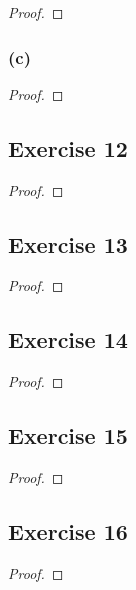 \documentclass[14pt]{extarticle}
\begin{document}
\begin{proof}

\end{proof}

\subsubsection{(c)}

\begin{proof}

\end{proof}

\subsection{Exercise 12}

\begin{proof}

\end{proof}

\subsection{Exercise 13}

\begin{proof}

\end{proof}

\subsection{Exercise 14}

\begin{proof}

\end{proof}

\subsection{Exercise 15}

\begin{proof}

\end{proof}

\subsection{Exercise 16}

\begin{proof}

\end{proof}
\end{document}
